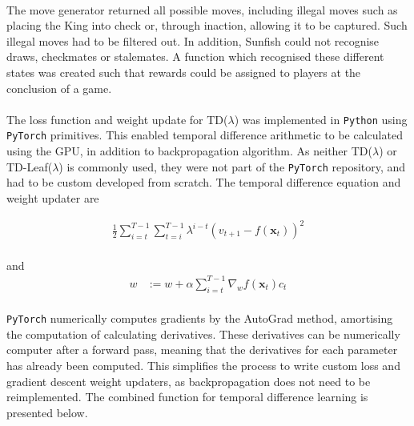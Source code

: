 \documentclass[12pt,a4paper]{book}
\begin{document}
\paragraph{} The move generator returned all possible moves, including illegal moves such as placing the King into check or, through inaction, allowing it to be captured. Such illegal moves had to be filtered out. In addition, Sunfish could not recognise draws, checkmates or stalemates. A function which recognised these different states was created such that rewards could be assigned to players at the conclusion of a game. 

\paragraph{} The loss function and weight update for TD($\lambda$) was implemented in \texttt{Python} using \texttt{PyTorch} primitives. This enabled temporal difference arithmetic to be calculated using the GPU, in addition to backpropagation algorithm. As neither TD($\lambda$) or TD-Leaf($\lambda$) is commonly used, they were not part of the \texttt{PyTorch} repository, and had to be custom developed from scratch. The temporal difference equation and weight updater are

\begin{align*}
  \frac{1}{2} \sum_{i=t}^{T-1} \sum_{t=i}^{T-1} \lambda^{i-t} (v_{t+1} - f(\mathbf{x}_t))^2
\end{align*}
\paragraph{} and
\begin{align*}
  w &:= w + \alpha \sum_{i=t}^{T-1} \nabla_w f(\mathbf{x}_t) c_t
\end{align*}

\paragraph{} \texttt{PyTorch} numerically computes gradients by the AutoGrad method, amortising the computation of calculating derivatives. These derivatives can be numerically computer after a forward pass, meaning that the derivatives for each parameter has already been computed. This simplifies the process to write custom loss and gradient descent weight updaters, as backpropagation does not need to be reimplemented. The combined function for temporal difference learning is presented below.
\end{document}
